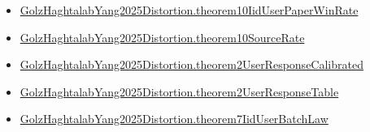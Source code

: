 \documentclass[10pt]{article}
\begin{document}
\begin{itemize}
\item \hyperlink{governing-declaration-a1441da0ef6b2fa2}{Golz\allowbreak{}Haghtalab\allowbreak{}Yang2025\allowbreak{}Distortion.\allowbreak{}theorem10\allowbreak{}Iid\allowbreak{}User\allowbreak{}Paper\allowbreak{}Win\allowbreak{}Rate}
\item \hyperlink{governing-declaration-aaf6dc2063f9888f}{Golz\allowbreak{}Haghtalab\allowbreak{}Yang2025\allowbreak{}Distortion.\allowbreak{}theorem10\allowbreak{}Source\allowbreak{}Rate}
\item \hyperlink{governing-declaration-080b9388e51a6018}{Golz\allowbreak{}Haghtalab\allowbreak{}Yang2025\allowbreak{}Distortion.\allowbreak{}theorem2\allowbreak{}User\allowbreak{}Response\allowbreak{}Calibrated}
\item \hyperlink{governing-declaration-c5d0273cbd7ddcc9}{Golz\allowbreak{}Haghtalab\allowbreak{}Yang2025\allowbreak{}Distortion.\allowbreak{}theorem2\allowbreak{}User\allowbreak{}Response\allowbreak{}Table}
\item \hyperlink{governing-declaration-485a7e8af83d2b11}{Golz\allowbreak{}Haghtalab\allowbreak{}Yang2025\allowbreak{}Distortion.\allowbreak{}theorem7\allowbreak{}Iid\allowbreak{}User\allowbreak{}Batch\allowbreak{}Law}
\end{itemize}
\end{document}
